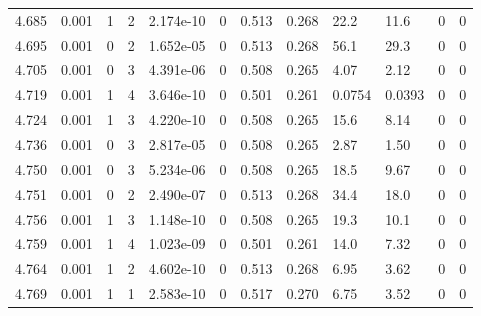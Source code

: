\documentclass[preview]{standalone}
\begin{document}
{{{{{{{{{{{{\begin{tabular}{L{1.2cm}C{1.2cm} C{0.3cm}C{0.5cm} C{1.4cm}C{1.4cm} C{1.4cm}C{1.4cm} C{1.6cm}C{1.6cm} C{1.6cm}C{1.6cm}}
  4.685  &  0.001  & 1     &  2 &  2.174e-10  & 0  &  0.513&   0.268& 22.2 & 11.6   &  0 & 0  \\ 
  4.695  &  0.001  & 0     &  2 &  1.652e-05  & 0  &  0.513&   0.268& 56.1 & 29.3   &  0 & 0  \\ 
  4.705  &  0.001  & 0     &  3 &  4.391e-06  & 0  &  0.508&   0.265& 4.07 & 2.12   &  0 & 0  \\ 
  4.719  &  0.001  & 1     &  4 &  3.646e-10  & 0  &  0.501&   0.261& 0.0754 & 0.0393   &  0 & 0  \\ 
  4.724  &  0.001  & 1     &  3 &  4.220e-10  & 0  &  0.508&   0.265& 15.6 & 8.14   &  0 & 0  \\ 
  4.736  &  0.001  & 0     &  3 &  2.817e-05  & 0  &  0.508&   0.265& 2.87 & 1.50   &  0 & 0  \\ 
  4.750  &  0.001  & 0     &  3 &  5.234e-06  & 0  &  0.508&   0.265& 18.5 & 9.67   &  0 & 0  \\ 
  4.751  &  0.001  & 0     &  2 &  2.490e-07  & 0  &  0.513&   0.268& 34.4 & 18.0   &  0 & 0  \\ 
  4.756  &  0.001  & 1     &  3 &  1.148e-10  & 0  &  0.508&   0.265& 19.3 & 10.1   &  0 & 0  \\ 
  4.759  &  0.001  & 1     &  4 &  1.023e-09  & 0  &  0.501&   0.261& 14.0 & 7.32   &  0 & 0  \\ 
  4.764  &  0.001  & 1     &  2 &  4.602e-10  & 0  &  0.513&   0.268& 6.95 & 3.62   &  0 & 0  \\ 
  4.769  &  0.001  & 1     &  1 &  2.583e-10  & 0  &  0.517&   0.270& 6.75 & 3.52   &  0 & 0  \\ 
\hline 
\end{tabular} 

}}}}}}}}}}}}
\end{document}
